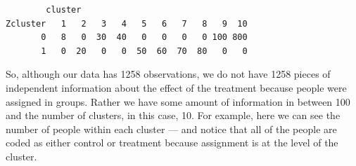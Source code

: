 \documentclass[
  12pt,
]{book}
\newenvironment{Shaded}{\begin{snugshade}}{\end{snugshade}}
\newcommand{\AttributeTok}[1]{\textcolor[rgb]{0.77,0.63,0.00}{#1}}
\newcommand{\CommentTok}[1]{\textcolor[rgb]{0.56,0.35,0.01}{\textit{#1}}}
\newcommand{\DecValTok}[1]{\textcolor[rgb]{0.00,0.00,0.81}{#1}}
\newcommand{\DocumentationTok}[1]{\textcolor[rgb]{0.56,0.35,0.01}{\textbf{\textit{#1}}}}
\newcommand{\FunctionTok}[1]{\textcolor[rgb]{0.00,0.00,0.00}{#1}}
\newcommand{\NormalTok}[1]{#1}
\newcommand{\OtherTok}[1]{\textcolor[rgb]{0.56,0.35,0.01}{#1}}
\newcommand{\SpecialCharTok}[1]{\textcolor[rgb]{0.00,0.00,0.00}{#1}}
\theoremstyle{definition}
\theoremstyle{definition}
\theoremstyle{definition}
\theoremstyle{remark}
\begin{document}
\begin{Shaded}
\end{Shaded}

\begin{verbatim}
        cluster
Zcluster   1   2   3   4   5   6   7   8   9  10
       0   8   0  30  40   0   0   0   0 100 800
       1   0  20   0   0  50  60  70  80   0   0
\end{verbatim}

So, although our data has 1258 observations, we do not have 1258 pieces
of independent information about the effect of the treatment because
people were assigned in groups. Rather we have some amount of
information in between 100 and the number of clusters, in this case, 10.
For example, here we can see the number of people within each cluster
--- and notice that all of the people are coded as either control or
treatment because assignment is at the level of the cluster.
\end{document}
